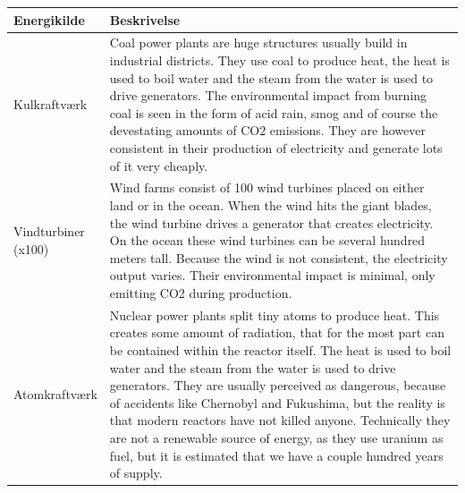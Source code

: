 \documentclass[a4paper,12pt]{report}
\begin{document}
\begin{table}[H]
\begin{tabular}{|p{0.2\linewidth}|p{0.8\linewidth}|}
\hline
\textbf{Energikilde} & \textbf{Beskrivelse}                                                                                                                                                                                                                                                                                                                                                                                                                                                                                                                                                         \\ \hline
Kulkraftværk         & Coal power plants are huge structures usually build in industrial districts. They use coal to produce heat, the heat is used to boil water and the steam from the water is used to drive generators. The environmental impact from burning coal is seen in the form of acid rain, smog and of course the devestating amounts of CO2 emissions. They are however consistent in their production of electricity and generate lots of it very cheaply.                                                                                                                          \\ \hline
Vindturbiner (x100)  & Wind farms consist of 100 wind turbines placed on either land or in the ocean. When the wind hits the giant blades, the wind turbine drives a generator that creates electricity. On the ocean these wind turbines can be several hundred meters tall. Because the wind is not consistent, the electricity output varies. Their environmental impact is minimal, only emitting CO2 during production.                                                                                                                                                                        \\ \hline
Atomkraftværk        & Nuclear power plants split tiny atoms to produce heat. This creates some amount of radiation, that for the most part can be contained within the reactor itself. The heat is used to boil water and the steam from the water is used to drive generators. They are usually perceived as dangerous, because of accidents like Chernobyl and Fukushima, but the reality is that modern reactors have not killed anyone. Technically they are not a renewable source of energy, as they use uranium as fuel, but it is estimated that we have a couple hundred years of supply. \\ \hline

\end{tabular}
\end{table}
\end{document}
